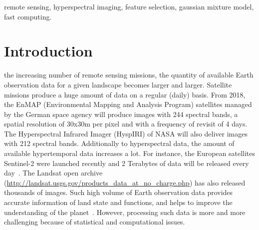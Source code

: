 \documentclass[journal,10pt]{IEEEtran}
\begin{document}
\begin{IEEEkeywords}
remote sensing, hyperspectral imaging, feature selection, gaussian mixture model, fast computing.
\end{IEEEkeywords}

%
\IEEEpeerreviewmaketitle

\section{Introduction}
\label{sec:intro}

 the increasing number of remote sensing missions, the
quantity of available Earth observation data for a given landscape becomes
larger and larger. Satellite missions produce a huge amount of data on a regular
(daily) basis. From 2018, the EnMAP (Environmental Mapping and Analysis Program)
satellites managed by the German space agency will produce images with 244
spectral bands, a spatial resolution of 30x30m per pixel and with a frequency of
revisit of 4 days\cite{Müller09enmap}. The Hyperspectral Infrared Imager
(HyspIRI) of NASA will also deliver images with 212 spectral bands. Additionally
to hyperspectral data, the amount of available hypertemporal data increases a
lot. For instance, the European satellites Sentinel-2 were launched recently and
2 Terabytes of data will be released every day~\cite{drusch2012sentinel}. The
Landsat open archive
(\url{http://landsat.usgs.gov/products_data_at_no_charge.php}) has also released
thousands of images. Such high volume of Earth observation data provides
accurate information of land state and functions, and helps to improve the
understanding of the planet~\cite{rs1010001}. However, processing such data is
more and more challenging because of statistical and computational issues.
\end{document}
